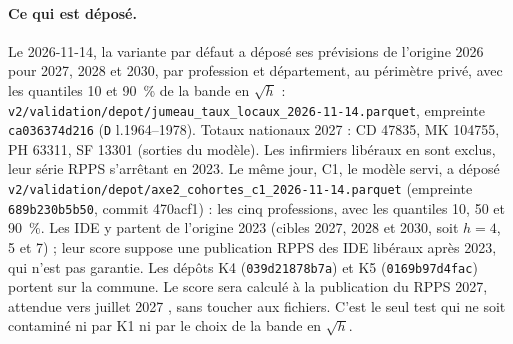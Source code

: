 \paragraph{Ce qui est déposé.} Le 2026-11-14, la variante par défaut a déposé ses prévisions de
l'origine 2026 pour 2027, 2028 et 2030, par profession et département, au périmètre privé, avec
les quantiles 10 et 90~\% de la bande en $\sqrt h$ :
\texttt{v2/\allowbreak validation/\allowbreak depot/\allowbreak jumeau\_taux\_locaux\_2026-11-14.parquet}, empreinte
\texttt{ca036374d216} (\texttt{D} l.1964--1978). Totaux nationaux 2027 : CD
\num{47835}\mesure, MK \num{104755}\mesure, PH \num{63311}\mesure, SF \num{13301}\mesure{} (sorties
du modèle). Les infirmiers libéraux en sont exclus, leur série RPPS s'arrêtant en 2023.
Le même jour, C1, le modèle servi, a déposé
\texttt{v2/\allowbreak validation/\allowbreak depot/\allowbreak axe2\_cohortes\_c1\_2026-11-14.parquet} (empreinte
\texttt{689b230b5b50}, commit 470acf1) : les cinq professions, avec les quantiles 10, 50 et 90~\%.
Les IDE y partent de l'origine 2023 (cibles 2027, 2028 et 2030, soit $h = 4$, 5 et 7\derive) ; leur
score suppose une publication RPPS des IDE libéraux après 2023, qui n'est pas garantie. Les
dépôts K4 (\texttt{039d21878b7a}) et K5 (\texttt{0169b97d4fac}) portent sur la commune. Le score
sera calculé à la publication du RPPS 2027, attendue vers juillet 2027 \citep{drees2026demo}, sans
toucher aux fichiers. C'est le seul test qui ne soit contaminé ni par K1 ni par le choix de la
bande en $\sqrt h$.

